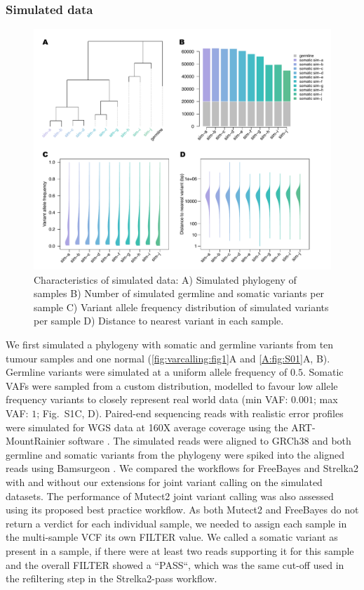 \subsubsection{Simulated data}
\label{variantcalling-sec:simdata}

\begin{figure}[htbp]
\centering
  \includegraphics[width=\textwidth]{Appendices/Variantcalling/supp/S1}
  \caption[Characteristics of simulated data]{Characteristics of simulated data: A) Simulated phylogeny of samples B) Number of simulated germline and somatic variants per sample C) Variant allele frequency distribution of simulated variants per sample D) Distance to nearest variant in each sample.}\label{A:fig:S01}
\end{figure}

We first simulated a phylogeny with somatic and germline variants from ten tumour samples and one normal (\autoref{fig:varcalling:fig1}A and \autoref{A:fig:S01}A, B). Germline variants were simulated at a uniform allele frequency of $0.5$. Somatic VAFs were sampled from a custom distribution, modelled to favour low allele frequency variants to closely represent real world data (min VAF: $0.001$; max VAF: $1$; Fig.~S1C, D). Paired-end sequencing reads with realistic error profiles were simulated for WGS data at 160X average coverage using the ART-MountRainier software \parencite{Huang2011}. The simulated reads were aligned to GRCh38 and both germline and somatic variants from the phylogeny were spiked into the aligned reads using Bamsurgeon \parencite{Ewing2015}. We compared the workflows for FreeBayes and Strelka2 with and without our extensions for joint variant calling on the simulated datasets. The performance of Mutect2 joint variant calling was also assessed using its proposed best practice workflow. As both Mutect2 and FreeBayes do not return a verdict for each individual sample, we needed to assign each sample in the multi-sample VCF its own FILTER value. We called a somatic variant as present in a sample, if there were at least two reads supporting it for this sample and the overall FILTER showed a ``PASS``, which was the same cut-off used in the refiltering step in the Strelka2-pass workflow.



